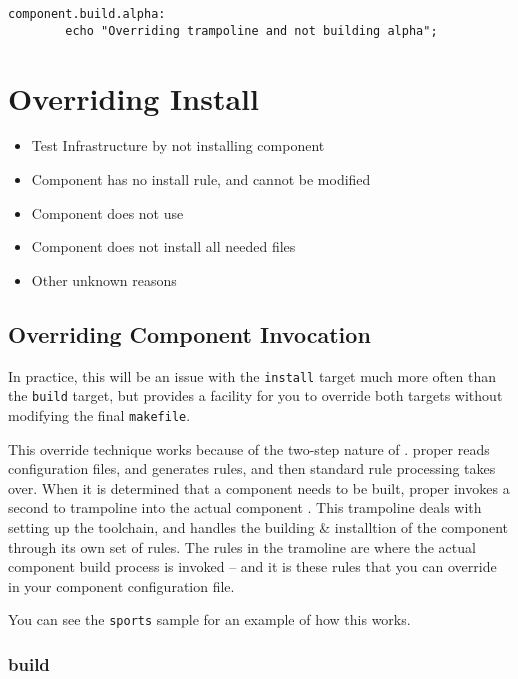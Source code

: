 \begin{verbatim}
component.build.alpha:
        echo "Overriding trampoline and not building alpha";
\end{verbatim}


\section{Overriding Install}

\begin{itemize}
\item Test \bni Infrastructure by not installing component
\item Component \makefile has no install rule, and cannot be modified
\item Component \makefile does not use \destdir
\item Component does not install all needed files
\item Other unknown reasons
\end{itemize}

\subsection{Overriding Component \makefile
  Invocation}\label{wrap:override-target}

In practice, this will be an issue with the \texttt{install} target
much more often than the \texttt{build} target, but \lmsbw provides a
facility for you to override both targets without modifying the final
\texttt{makefile}.

This override technique works because of the two-step nature of
\lmsbw.  \lmsbw proper reads configuration files, and generates \make
rules, and then standard \make rule processing takes over.  When it is
determined that a component needs to be built, \lmsbw proper invokes a
second \makefile to trampoline into the actual component \makefile.
This trampoline deals with setting up the toolchain, and handles the
building \& installtion of the component through its own set of \make
rules.  The \make rules in the tramoline \makefile are where the
actual component build process is invoked -- and it is these rules
that you can override in your component configuration file.

You can see the \texttt{sports} sample for an example of how this
works.

\subsubsection{build}\label{wrap:override-target-build}

